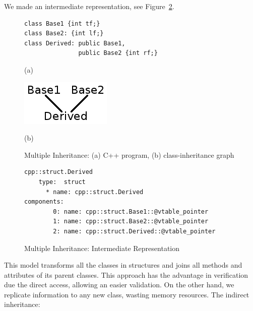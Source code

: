 \documentclass[a4paper]{llncs}
\begin{document}
We made an intermediate representation, see Figure~\ref{figure:multiple-inheritance-IR}.

\begin{figure}[h]

\begin{minipage}[b]{.6\linewidth}
\begin{lstlisting}
class Base1 {int tf;}
class Base2: {int lf;}
class Derived: public Base1, 
               public Base2 {int rf;}
\end{lstlisting}
  \centerline{(a)}\medskip
\end{minipage}
\label{figure:multiple-inheritance-code}
%
\begin{minipage}[b]{.48\linewidth}
  \centering
  \centerline{\includegraphics[scale=0.5]{figures/multiple_inheritance_graph}}
  \centerline{(b)}\medskip
\end{minipage}
%
\caption{Multiple Inheritance: (a) C++ program, (b) class-inheritance graph}
\label{fig:multiple-inheritance-graph}
\end{figure}


\begin{figure}[h]
\centering
\begin{minipage}{0.9\textwidth}
\begin{lstlisting}[style=nonumbers]
cpp::struct.Derived
    type:  struct
      * name: cpp::struct.Derived
components: 
        0: name: cpp::struct.Base1::@vtable_pointer
        1: name: cpp::struct.Base2::@vtable_pointer
        2: name: cpp::struct.Derived::@vtable_pointer
\end{lstlisting}
\end{minipage}
\caption{Multiple Inheritance: Intermediate Representation}
\label{figure:multiple-inheritance-IR}
\end{figure}

This model transforms all the classes in structures and joins all methods and attributes of its parent classes.  This approach has the advantage in verification due the direct access, allowing an easier validation. On the other hand, we replicate information to any new class, wasting memory resources.
The indirect inheritance:
\end{document}
